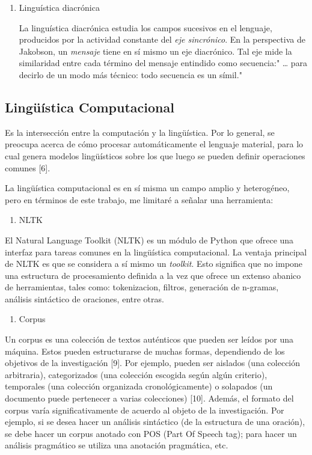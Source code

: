 \documentclass[twoside]{article}
\begin{document}
\begin{enumerate}
\item Linguística diacrónica 

La linguística diacrónica estudia los campos sucesivos en el 
lenguaje, producidos por la actividad constante del \emph{eje 
sincrónico}. En la perspectiva 
 de Jakobson, un \emph{mensaje} tiene en sí mismo un eje 
 diacrónico. Tal eje mide la similaridad entre cada
 término del mensaje entindido como secuencia:"
 \ldots{} para decirlo de un modo más técnico: todo
 secuencia es un símil."
\end{enumerate}

\subsection{Lingüística Computacional}
\label{sec:org705004a}


Es la intersección entre la computación y la lingüística. Por lo
general, se preocupa acerca de cómo procesar automáticamente el
lenguaje material, para lo cual genera modelos lingüísticos sobre los
que luego se pueden definir operaciones comunes [6].


La lingüística computacional es en sí misma un campo amplio y
heterogéneo, pero en términos de este trabajo, me limitaré a señalar
una herramienta:

\begin{enumerate}
\item NLTK
\end{enumerate}

El Natural Language Toolkit (NLTK) es un módulo de Python que ofrece
una interfaz para tareas comunes en la lingüística computacional. La
ventaja principal de NLTK es que se considera a sí mismo un
\emph{toolkit}. Esto significa que no impone una estructura de
procesamiento definida a la vez que ofrece un extenso abanico de
herramientas, tales como: tokenizacion, filtros, generación de
n-gramas, análisis sintáctico de oraciones, entre otras.

\begin{enumerate}
\item Corpus
\end{enumerate}


Un corpus es una colección de textos auténticos que pueden ser leídos
por una máquina. Estos pueden estructurarse de muchas formas,
dependiendo de los objetivos de la investigación [9]. Por ejemplo,
pueden ser aislados (una colección arbitraria), categorizados (una
colección escogida según algún criterio), temporales (una colección
organizada cronológicamente) o solapados (un documento puede
pertenecer a varias colecciones) [10]. Además, el formato del corpus
varía significativamente de acuerdo al objeto de la investigación. Por
ejemplo, si se desea hacer un análisis sintáctico (de la estructura de
una oración), se debe hacer un corpus anotado con POS (Part Of Speech
tag); para hacer un análisis pragmático se utiliza una anotación
pragmática, etc.
\end{document}
